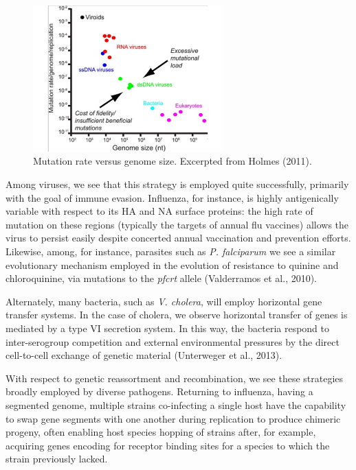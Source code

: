 \documentclass[11pt,letterpaper,final] {article}
\begin{document}
\begin{figure}[htp]
  \centering
    \includegraphics[width=0.65\textwidth]{mutation}
	\caption{Mutation rate versus genome size. Excerpted from Holmes (2011).}
	\label{fig:03}
\end{figure}

Among viruses, we see that this strategy is employed quite successfully, primarily with the goal of immune evasion. Influenza, for instance, is highly antigenically variable with respect to its HA and NA surface proteins: the high rate of mutation on these regions (typically the targets of annual flu vaccines) allows the virus to persist easily despite concerted annual vaccination and prevention efforts. Likewise, among, for instance, parasites such as \textit{P. falciparum} we see a similar evolutionary mechanism employed in the evolution of resistance to quinine and chloroquinine, via mutations to the \textit{pfcrt} allele (Valderramos et al., 2010).

Alternately, many bacteria, such as \textit{V. cholera}, will employ horizontal gene transfer systems. In the case of cholera, we observe horizontal transfer of genes is mediated by a type VI secretion system. In this way, the bacteria respond to inter-serogroup competition and external environmental pressures by the direct cell-to-cell exchange of genetic material (Unterweger et al., 2013).

With respect to genetic reassortment and recombination, we see these strategies broadly employed by diverse pathogens. Returning to influenza, having a segmented genome, multiple strains co-infecting a single host have the capability to swap gene segments with one another during replication to produce chimeric progeny, often enabling host species hopping of strains after, for example, acquiring genes encoding for receptor binding sites for a species to which the strain previously lacked.
\end{document}
